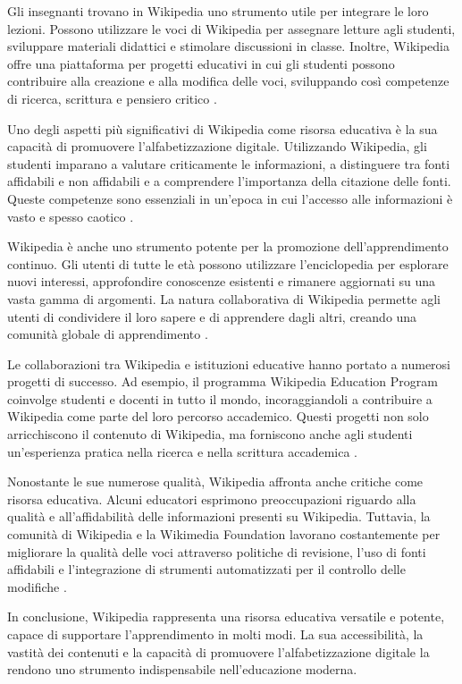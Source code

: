 \documentclass[12pt,a4paper]{report}
\begin{document}
Gli insegnanti trovano in Wikipedia uno strumento utile per integrare le loro lezioni. Possono utilizzare le voci di Wikipedia per assegnare letture agli studenti, sviluppare materiali didattici e stimolare discussioni in classe. Inoltre, Wikipedia offre una piattaforma per progetti educativi in cui gli studenti possono contribuire alla creazione e alla modifica delle voci, sviluppando così competenze di ricerca, scrittura e pensiero critico \cite{jemielniak2014wikipedia}.

Uno degli aspetti più significativi di Wikipedia come risorsa educativa è la sua capacità di promuovere l'alfabetizzazione digitale. Utilizzando Wikipedia, gli studenti imparano a valutare criticamente le informazioni, a distinguere tra fonti affidabili e non affidabili e a comprendere l'importanza della citazione delle fonti. Queste competenze sono essenziali in un'epoca in cui l'accesso alle informazioni è vasto e spesso caotico \cite{lih2009wikipedia}.

Wikipedia è anche uno strumento potente per la promozione dell'apprendimento continuo. Gli utenti di tutte le età possono utilizzare l'enciclopedia per esplorare nuovi interessi, approfondire conoscenze esistenti e rimanere aggiornati su una vasta gamma di argomenti. La natura collaborativa di Wikipedia permette agli utenti di condividere il loro sapere e di apprendere dagli altri, creando una comunità globale di apprendimento \cite{history_of_wikis}.

Le collaborazioni tra Wikipedia e istituzioni educative hanno portato a numerosi progetti di successo. Ad esempio, il programma Wikipedia Education Program coinvolge studenti e docenti in tutto il mondo, incoraggiandoli a contribuire a Wikipedia come parte del loro percorso accademico. Questi progetti non solo arricchiscono il contenuto di Wikipedia, ma forniscono anche agli studenti un'esperienza pratica nella ricerca e nella scrittura accademica \cite{jemielniak2014wikipedia}.

Nonostante le sue numerose qualità, Wikipedia affronta anche critiche come risorsa educativa. Alcuni educatori esprimono preoccupazioni riguardo alla qualità e all'affidabilità delle informazioni presenti su Wikipedia. Tuttavia, la comunità di Wikipedia e la Wikimedia Foundation lavorano costantemente per migliorare la qualità delle voci attraverso politiche di revisione, l'uso di fonti affidabili e l'integrazione di strumenti automatizzati per il controllo delle modifiche \cite{denning2005wikipedia}.

In conclusione, Wikipedia rappresenta una risorsa educativa versatile e potente, capace di supportare l'apprendimento in molti modi. La sua accessibilità, la vastità dei contenuti e la capacità di promuovere l'alfabetizzazione digitale la rendono uno strumento indispensabile nell'educazione moderna.
\end{document}
